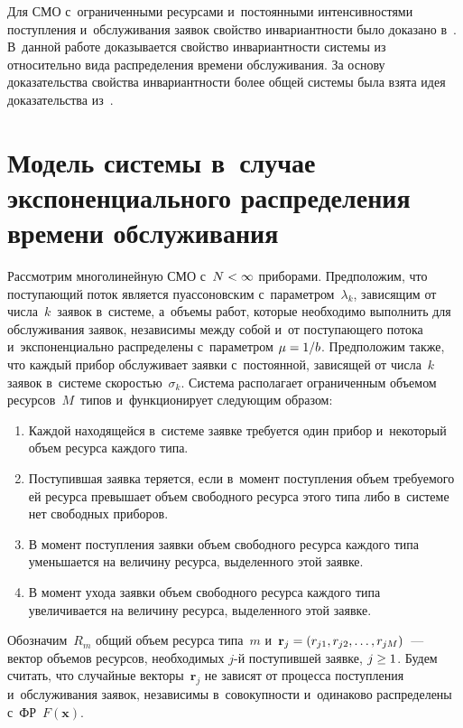 \begin{multicols}{2}
  Для СМО с~ограниченными ресурсами и~постоянными интенсивностями 
поступления и~обслуживания заявок свойство инвариантности было доказано 
в~\cite{6-sop}. В~данной работе доказывается свойство инвариантности 
сис\-те\-мы из~\cite{3-sop} относительно вида распределения времени 
обслуживания. За основу доказательства свойства инвариантности более 
общей сис\-те\-мы была взята идея доказательства из~\cite{7-sop}.

\vspace*{-6pt}

\section{Модель системы в~случае экспоненциального 
распределения времени обслуживания}

  Рассмотрим многолинейную СМО
с~$N\hm<\infty$ приборами. Предположим, что поступающий поток является 
пуассоновским с~параметром~$\lambda_k$, зависящим от чис\-ла~$k$~заявок 
в~сис\-те\-ме, а~объемы работ, которые необходимо выполнить для 
обслуживания заявок, независимы между собой и~от поступающего потока 
и~экспоненциально распределены с~параметром $\mu\hm=1/b$. 
Предположим также, что каждый прибор обслуживает заявки с~постоянной, 
зависящей от числа~$k$ заявок в~сис\-те\-ме ско\-ростью~$\sigma_k$. Сис\-те\-ма 
располагает ограниченным объемом ресурсов~$M$~типов и~функционирует 
сле\-ду\-ющим образом:
  \begin{enumerate}[1.]
\item Каждой находящейся в~сис\-те\-ме заявке требуется один прибор 
и~некоторый объем ресурса каждого типа.
  \item Поступившая заявка теряется, если в~момент поступления объем 
требуемого ей ресурса превышает объем свободного ресурса этого типа либо 
в~сис\-те\-ме нет свободных приборов. 
  \item В момент поступления заявки объем свободного ресурса каждого 
типа уменьшается на величину ресурса, выделенного этой заявке.
  \item В момент ухода заявки объем свободного ресурса каждого типа 
увеличивается на величину ресурса, выделенного этой заявке.
  \end{enumerate}
  
  Обозначим~$R_m$ общий объем ресурса типа~$m$ и~$\mathbf{r}_j\hm= 
\left( r_{j1}, r_{j2},\ldots , r_{jM}\right)$~--- вектор объемов ресурсов, 
необходимых $j$-й поступившей заявке, $j\hm\geq 1$. Будем считать, что 
случайные векторы~$\mathbf{r}_j$ не зависят от процесса поступления 
и~обслуживания заявок, независимы в~совокупности и~одинаково 
распределены с~ФР~$F(\mathbf{x})$.
  

\end{multicols}
